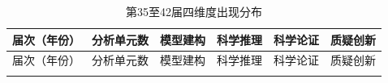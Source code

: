 \documentclass[
  12pt,
  a4paper,twoside,openany]{ctexbook}
\begin{document}
\begin{longtable}[]{@{}
  >{\raggedright\arraybackslash}p{}
  >{\raggedleft\arraybackslash}p{}
  >{\raggedleft\arraybackslash}p{}
  >{\raggedleft\arraybackslash}p{}
  >{\raggedleft\arraybackslash}p{}
  >{\raggedleft\arraybackslash}p{}@{}}
\caption{第35至42届四维度出现分布}\tabularnewline
\toprule\noalign{}
\rowcolor{ThesisPale}
\begin{minipage}[b]{\linewidth}\raggedright
届次（年份）
\end{minipage} & \begin{minipage}[b]{\linewidth}\raggedleft
分析单元数
\end{minipage} & \begin{minipage}[b]{\linewidth}\raggedleft
模型建构
\end{minipage} & \begin{minipage}[b]{\linewidth}\raggedleft
科学推理
\end{minipage} & \begin{minipage}[b]{\linewidth}\raggedleft
科学论证
\end{minipage} & \begin{minipage}[b]{\linewidth}\raggedleft
质疑创新
\end{minipage} \\
\midrule\noalign{}
\endfirsthead
\toprule\noalign{}
\rowcolor{ThesisPale}
\begin{minipage}[b]{\linewidth}\raggedright
届次（年份）
\end{minipage} & \begin{minipage}[b]{\linewidth}\raggedleft
分析单元数
\end{minipage} & \begin{minipage}[b]{\linewidth}\raggedleft
模型建构
\end{minipage} & \begin{minipage}[b]{\linewidth}\raggedleft
科学推理
\end{minipage} & \begin{minipage}[b]{\linewidth}\raggedleft
科学论证
\end{minipage} & \begin{minipage}[b]{\linewidth}\raggedleft
质疑创新
\end{minipage} \\
\midrule\noalign{}

\end{longtable}
\end{document}

